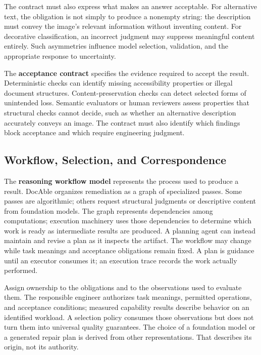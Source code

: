 The contract must also express what makes an answer acceptable. For alternative text, the obligation is not simply to produce a nonempty string: the description must convey the image's relevant information without inventing content. For decorative classification, an incorrect judgment may suppress meaningful content entirely. Such asymmetries influence model selection, validation, and the appropriate response to uncertainty.

The \textbf{acceptance contract} specifies the evidence required to accept the result. Deterministic checks can identify missing accessibility properties or illegal document structures. Content-preservation checks can detect selected forms of unintended loss. Semantic evaluators or human reviewers assess properties that structural checks cannot decide, such as whether an alternative description accurately conveys an image. The contract must also identify which findings block acceptance and which require engineering judgment.

\subsection*{Workflow, Selection, and Correspondence}

The \textbf{reasoning workflow model} represents the process used to produce a result. DocAble organizes remediation as a graph of specialized passes. Some passes are algorithmic; others request structural judgments or descriptive content from foundation models. The graph represents dependencies among computations; execution machinery uses those dependencies to determine which work is ready as intermediate results are produced. A planning agent can instead maintain and revise a plan as it inspects the artifact. The workflow may change while task meanings and acceptance obligations remain fixed. A plan is guidance until an executor consumes it; an execution trace records the work actually performed.

Assign ownership to the obligations and to the observations used to evaluate them. The responsible engineer authorizes task meanings, permitted operations, and acceptance conditions; measured capability results describe behavior on an identified workload. A selection policy consumes those observations but does not turn them into universal quality guarantees. The choice of a foundation model or a generated repair plan is derived from other representations. That describes its origin, not its authority.

